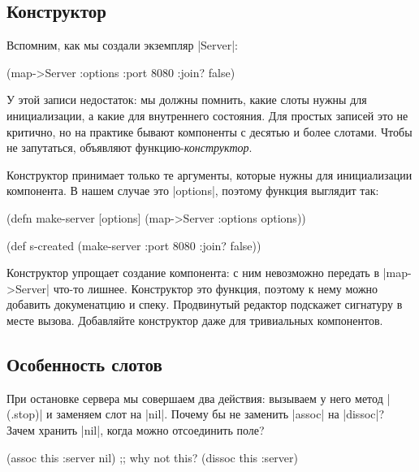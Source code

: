\subsection{Конструктор}

Вспомним, как мы создали экземпляр \spverb|Server|:

\begin{english}
  \begin{clojure}
(map->Server {:options {:port 8080 :join? false}})
  \end{clojure}
\end{english}

У этой записи недостаток: мы должны помнить, какие слоты нужны для
инициализации, а какие для внутреннего состояния. Для простых записей это не
критично, но на практике бывают компоненты с десятью и более слотами. Чтобы не
запутаться, объявляют функцию-\emph{конструктор}.

Конструктор принимает только те аргументы, которые нужны для инициализации
компонента. В нашем случае это \spverb|options|, поэтому функция выглядит так:

\begin{english}
  \begin{clojure}
(defn make-server
  [options]
  (map->Server {:options options}))

(def s-created (make-server {:port 8080 :join? false}))
  \end{clojure}
\end{english}

Конструктор упрощает создание компонента: с ним невозможно передать в
\spverb|map->Server| что-то лишнее. Конструктор это функция, поэтому к нему
можно добавить докуменатцию и спеку. Продвинутый редактор подскажет сигнатуру в
месте вызова. Добавляйте конструктор даже для тривиальных компонентов.

\subsection{Особенность слотов}

При остановке сервера мы совершаем два действия: вызываем у него метод
\spverb|(.stop)| и заменяем слот на \spverb|nil|. Почему бы не заменить
\spverb|assoc| на \spverb|dissoc|? Зачем хранить \spverb|nil|, когда можно
отсоединить поле?

\begin{english}
  \begin{clojure}
(assoc this :server nil)
;; why not this?
(dissoc this :server)
  \end{clojure}
\end{english}

